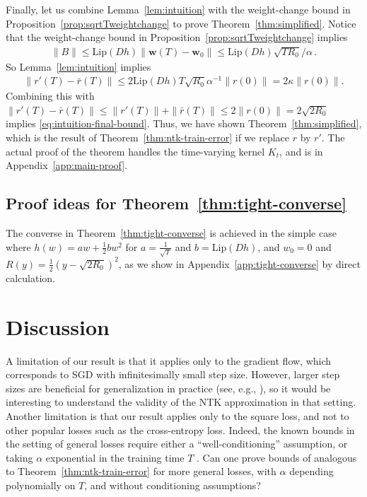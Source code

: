 \documentclass[11pt]{article} %
\newcommand{\<}{\langle}
\renewcommand{\>}{\rangle}
\def\bw{{\boldsymbol w}}
\newcommand{\Lip}{\mathrm{Lip}}
\theoremstyle{plain}
\theoremstyle{definition}
\theoremstyle{remark}
\begin{document}
 Finally, let us combine Lemma~\ref{lem:intuition} with the weight-change bound in Proposition~\ref{prop:sqrtTweightchange} to prove Theorem~\ref{thm:simplified}. Notice that the weight-change bound in Proposition~\ref{prop:sqrtTweightchange} implies \begin{align*}
\|B\| \leq \Lip(Dh) \|\bw(T) - \bw_0\|  \leq \Lip(Dh) \sqrt{T R_0} / \alpha\,.
\end{align*}
So Lemma~\ref{lem:intuition} implies
\begin{align*}
\|r'(T) - \bar{r}(T)\| \leq 2\Lip(Dh) T \sqrt{R_0} \alpha^{-1} \|r(0)\| = 2\kappa\|r(0)\|.
\end{align*}
Combining this with $\|r'(T) - \bar{r}(T)\| \leq \|r'(T)\| + \|\bar{r}(T)\| \leq 2\|r(0)\| = 2\sqrt{2R_0}$ implies
\eqref{eq:intuition-final-bound}. Thus, we have shown Theorem~\ref{thm:simplified}, which is the result of Theorem~\ref{thm:ntk-train-error} if we replace $r$ by $r'$. The actual proof of the theorem handles the time-varying kernel $K_t$, and is in Appendix~\ref{app:main-proof}.



\subsection{Proof ideas for Theorem~\ref{thm:tight-converse}}
The converse in Theorem~\ref{thm:tight-converse} is achieved in the simple case where $h(w) = aw + \frac{1}{2}bw^2$ for $a = \frac{1}{\sqrt{T}}$ and $b = \Lip(Dh)$, and $w_0 = 0$ and $R(y) = \frac{1}{2}(y - \sqrt{2R_0})^2$, as we show in Appendix~\ref{app:tight-converse} by direct calculation.

\section{Discussion}

A limitation of our result is that it applies only to the gradient flow, which corresponds to SGD with infinitesimally small step size. However, larger step sizes are beneficial for generalization in practice (see, e.g., \cite{li2021validity,andriushchenko2022sgd}), so it would be interesting to understand the validity of the NTK approximation in that setting. Another limitation is that our result applies only to the square loss, and not to other popular losses such as the cross-entropy loss. Indeed, the known bounds in the setting of general losses require either a ``well-conditioning'' assumption, or taking $\alpha$ exponential in the training time $T$ \citep{chizat2019lazy}. Can one prove bounds of analogous to Theorem~\ref{thm:ntk-train-error} for more general losses, with $\alpha$ depending polynomially on $T$, and without conditioning assumptions?
\end{document}
